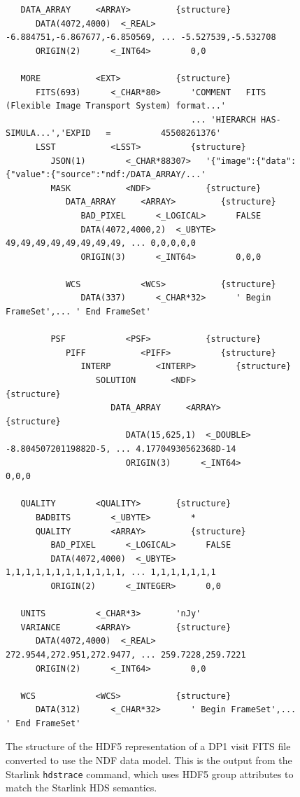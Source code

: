 \begin{figure}[!tbp]
  \begin{center}
    \begin{small}
\begin{verbatim}
   DATA_ARRAY     <ARRAY>         {structure}
      DATA(4072,4000)  <_REAL>       -6.884751,-6.867677,-6.850569, ... -5.527539,-5.532708
      ORIGIN(2)      <_INT64>        0,0

   MORE           <EXT>           {structure}
      FITS(693)      <_CHAR*80>      'COMMENT   FITS (Flexible Image Transport System) format...'
                                     ... 'HIERARCH HAS-SIMULA...','EXPID   =          45508261376'
      LSST           <LSST>          {structure}
         JSON(1)        <_CHAR*88307>   '{"image":{"data":{"value":{"source":"ndf:/DATA_ARRAY/...'
         MASK           <NDF>           {structure}
            DATA_ARRAY     <ARRAY>         {structure}
               BAD_PIXEL      <_LOGICAL>      FALSE
               DATA(4072,4000,2)  <_UBYTE>    49,49,49,49,49,49,49,49, ... 0,0,0,0,0
               ORIGIN(3)      <_INT64>        0,0,0

            WCS            <WCS>           {structure}
               DATA(337)      <_CHAR*32>      ' Begin FrameSet',... ' End FrameSet'

         PSF            <PSF>           {structure}
            PIFF           <PIFF>          {structure}
               INTERP         <INTERP>        {structure}
                  SOLUTION       <NDF>           {structure}
                     DATA_ARRAY     <ARRAY>         {structure}
                        DATA(15,625,1)  <_DOUBLE>      -8.80450720119882D-5, ... 4.17704930562368D-14
                        ORIGIN(3)      <_INT64>        0,0,0

   QUALITY        <QUALITY>       {structure}
      BADBITS        <_UBYTE>        *
      QUALITY        <ARRAY>         {structure}
         BAD_PIXEL      <_LOGICAL>      FALSE
         DATA(4072,4000)  <_UBYTE>      1,1,1,1,1,1,1,1,1,1,1,1, ... 1,1,1,1,1,1,1
         ORIGIN(2)      <_INTEGER>      0,0

   UNITS          <_CHAR*3>       'nJy'
   VARIANCE       <ARRAY>         {structure}
      DATA(4072,4000)  <_REAL>       272.9544,272.951,272.9477, ... 259.7228,259.7221
      ORIGIN(2)      <_INT64>        0,0

   WCS            <WCS>           {structure}
      DATA(312)      <_CHAR*32>      ' Begin FrameSet',... ' End FrameSet'
\end{verbatim}
    \end{small}
  \end{center}
  \caption{The structure of the HDF5 representation of a DP1 visit FITS file converted to use the NDF data model. This is the output from the Starlink \texttt{hdstrace} command, which uses HDF5 group attributes to match the Starlink HDS semantics.}
  \label{fig:dp1-ndf}
\end{figure}

